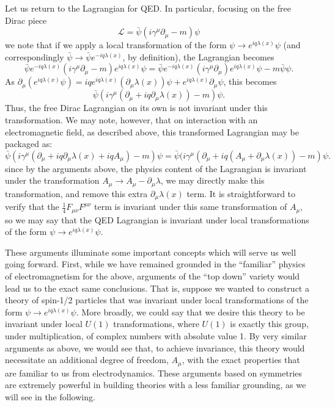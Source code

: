 Let us return to the Lagrangian for QED. In particular, focusing on the free Dirac piece
\begin{equation}
\mathcal{L} = \bar{\psi}(i\gamma^{\mu}\partial_{\mu} - m)\psi 
\end{equation}
we note that if we apply a local transformation of the form $\psi\rightarrow e^{iq\lambda(x)}\psi$
(and correspondingly $\bar{\psi}\rightarrow \bar{\psi}e^{-iq\lambda(x)}$, by definition), the Lagrangian 
becomes
\begin{equation}
\bar{\psi}e^{-iq\lambda(x)}(i\gamma^{\mu}\partial_{\mu} - m)e^{iq\lambda(x)}\psi = 
\bar{\psi}e^{-iq\lambda(x)}(i\gamma^{\mu}\partial_{\mu})e^{iq\lambda(x)}\psi - m\bar{\psi}\psi.
\end{equation}
As $\partial_{\mu} (e^{iq\lambda(x)}\psi) = iqe^{iq\lambda(x)}(\partial_{\mu}\lambda(x))\psi + e^{iq\lambda(x)}\partial_{\mu}\psi$, this becomes
\begin{equation}
\bar{\psi}(i\gamma^{\mu}(\partial_{\mu}+iq\partial_{\mu}\lambda(x)) - m)\psi.
\end{equation}
Thus, the free Dirac Lagrangian on its own is not invariant under this transformation. We may note, however,
that on interaction with an electromagnetic field, as described above, this transformed Lagrangian
may be packaged as:
\begin{equation}
\bar{\psi}(i\gamma^{\mu}(\partial_{\mu}+ iq\partial_{\mu}\lambda(x)+iq A_{\mu}) - m)\psi =
\bar{\psi}(i\gamma^{\mu}(\partial_{\mu}+ iq(A_{\mu}+\partial_{\mu}\lambda(x)) - m)\psi.
\end{equation}
since by the arguments above, the physics content of the Lagrangian is invariant under the transformation 
$A_{\mu} \rightarrow A_{\mu} - \partial_{\mu}\lambda$,  we may directly make this transformation, and remove 
this extra $\partial_{\mu}\lambda(x)$ term. It is straightforward to verify that the $\frac{1}{4} F_{\mu\nu}F^{\mu\nu}$
term is invariant under this same transformation of $A_{\mu}$, so we may say that the QED Lagrangian is 
invariant under local transformations of the form $\psi\rightarrow e^{iq\lambda(x)}\psi$.

These arguments illuminate some important concepts which will serve us well going forward. First, while we have 
remained grounded in the ``familiar'' physics of electromagnetism for the above, arguments of the ``top down''
variety would lead us to the exact same conclusions. That is, suppose we wanted to construct a theory of 
spin-1/2 particles that was invariant under local transformations of the form $\psi\rightarrow e^{iq\lambda(x)}\psi$. 
More broadly, we could say that we desire this theory to be invariant under local $U(1)$ transformations, where 
$U(1)$ is exactly this group, under multiplication, of complex numbers with absolute value 1. By very similar 
arguments as above, we would see that, to achieve invariance, this theory would necessitate an additional degree 
of freedom, $A_{\mu}$, with the exact properties that are familiar to us from electrodynamics. These arguments 
based on symmetries are extremely powerful in building theories with a less familiar grounding, as we will 
see in the following.


